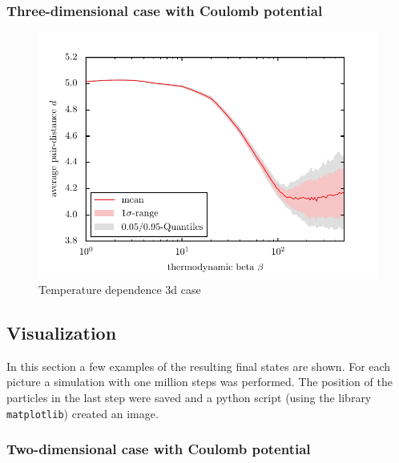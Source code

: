 \documentclass[11pt, a4paper]{article}
\numberwithin{equation}{section}
\begin{document}
\subsubsection{Three-dimensional case with Coulomb potential}
\begin{figure}
	\centering
	\includegraphics{./figures/temp_dep_coulomb3d.pdf}
	\caption{Temperature dependence 3d case}
\end{figure}



\subsection{Visualization} \label{sec:Visualisation}
In this section a few examples of the resulting final states are shown.
For each picture a simulation with one million steps was performed.
The position of the particles in the last step were saved and a python script (using the library \texttt{matplotlib}) created an image.

\subsubsection{Two-dimensional case with Coulomb potential} \label{sec:2d_coulomb_vis}
\end{document}
